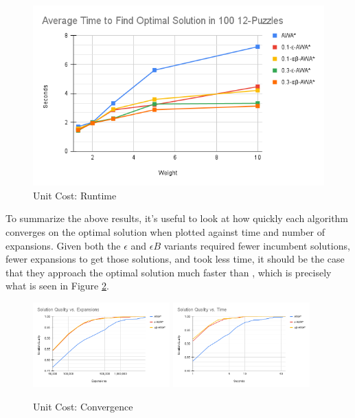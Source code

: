 \begin{figure}
    \begin{center}\includegraphics[scale=0.35]{media/Average Time to Find Optimal Solution in 100 12-Puzzles.png}\end{center}
    \caption{Unit Cost: Runtime}\label{fig:run}
\end{figure}

To summarize the above results, it's useful to look at how quickly each algorithm converges on the optimal solution when plotted against time and number of expansions. Given both the $\epsilon$ and $\epsilon B$ variants required fewer incumbent solutions, fewer expansions to get those solutions, and took less time, it should be the case that they approach the optimal solution much faster than \awa, which is precisely what is seen in Figure \ref{fig:conv-man}.


\begin{figure}
    \includegraphics[width=0.47\textwidth]{media/man-Solution Quality vs. Expansions.png}
    \includegraphics[width=0.47\textwidth]{media/man-Solution Quality vs. Time.png}
    \caption{Unit Cost: Convergence} \label{fig:conv-man}
\end{figure}

